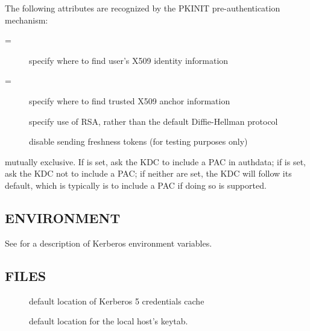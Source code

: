 \documentclass[letterpaper,10pt,english]{sphinxmanual}
\begin{document}
\begin{description}
The following attributes are recognized by the PKINIT
pre-authentication mechanism:
\begin{description}
\item[{=}] \leavevmode
specify where to find user’s X509 identity information

\item[{=}] \leavevmode
specify where to find trusted X509 anchor information

\item[{\sphinxstylestrong{flag\_RSA\_PROTOCOL}{[}\sphinxstylestrong{=yes}{]}}] \leavevmode
specify use of RSA, rather than the default Diffie-Hellman
protocol

\item[{\sphinxstylestrong{disable\_freshness}{[}\sphinxstylestrong{=yes}{]}}] \leavevmode
disable sending freshness tokens (for testing purposes only)

\end{description}

\item[{\sphinxstylestrong{\textendash{}request-pac} \textbar{} \sphinxstylestrong{\textendash{}no-request-pac}}] \leavevmode
mutually exclusive.  If  is set, ask the KDC to
include a PAC in authdata; if  is set, ask the
KDC not to include a PAC; if neither are set,  the KDC will follow
its default, which is typically is to include a PAC if doing so is
supported.

\end{description}


\subsection{ENVIRONMENT}
\label{\detokenize{user/user_commands/kinit:environment}}
See {\hyperref[\detokenize{user/user_config/kerberos:kerberos-7}]{}} for a description of Kerberos environment
variables.


\subsection{FILES}
\label{\detokenize{user/user_commands/kinit:files}}\begin{description}
\item[{}] \leavevmode
default location of Kerberos 5 credentials cache

\item[{}] \leavevmode
default location for the local host’s keytab.

\end{description}
\end{document}
